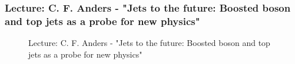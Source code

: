 \documentclass[11pt,a4paper]{article}
\numberwithin{equation}{section}
\numberwithin{table}{section}\setlength{\multlinegap}{25pt}
\begin{document}
\subsubsection{Lecture: C. F. Anders  - "Jets to the future: Boosted boson and top jets as a probe for new physics"}

\begin{figure}[H]
\centering
\null\hfill %
\hfill %
\hfill %
\hfill %
\hfill\null %
\caption{Lecture: C. F. Anders  - "Jets to the future: Boosted boson and top jets as a probe for new physics"}
\end{figure} 
\end{document}
